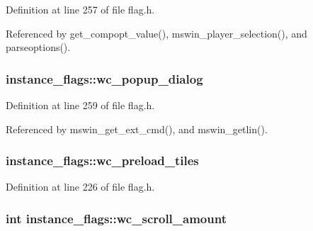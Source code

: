 Definition at line 257 of file flag.\+h.



Referenced by get\+\_\+compopt\+\_\+value(), mswin\+\_\+player\+\_\+selection(), and parseoptions().

\hypertarget{structinstance__flags_ad05c48ad36fa58a2a5dc55fbe8bc7d92}{
\subsubsection[{wc\+\_\+popup\+\_\+dialog}]{ instance\+\_\+flags\+::wc\+\_\+popup\+\_\+dialog}}\label{structinstance__flags_ad05c48ad36fa58a2a5dc55fbe8bc7d92}


Definition at line 259 of file flag.\+h.



Referenced by mswin\+\_\+get\+\_\+ext\+\_\+cmd(), and mswin\+\_\+getlin().

\hypertarget{structinstance__flags_a86f9cf66a3944b622014a05ff93a006e}{
\subsubsection[{wc\+\_\+preload\+\_\+tiles}]{ instance\+\_\+flags\+::wc\+\_\+preload\+\_\+tiles}}\label{structinstance__flags_a86f9cf66a3944b622014a05ff93a006e}


Definition at line 226 of file flag.\+h.

\hypertarget{structinstance__flags_ae26c02a271148327f70765f3ae5088af}{
\subsubsection[{wc\+\_\+scroll\+\_\+amount}]{\setlength{\rightskip}{0pt plus 5cm}int instance\+\_\+flags\+::wc\+\_\+scroll\+\_\+amount}}\label{structinstance__flags_ae26c02a271148327f70765f3ae5088af}



